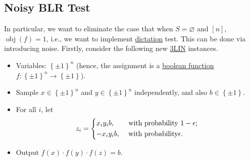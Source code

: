 \subsection{Noisy BLR Test}
In particular, we want to eliminate the case that when \(S = \varnothing \) and \([n]\), \(\mathop{\mathrm{obj}}(f) = 1\), i.e., we want to implement \hyperref[def:dictation]{dictation} test. This can be done via introducing noise. Firstly, consider the following new \hyperref[prb:max-3LIN]{3LIN} instances.

\begin{itemize}
	\item Variables: \(\left\{ \pm 1 \right\} ^n\) (hence, the assignment is a \hyperref[def:boolean-function]{boolean function} \(f\colon \left\{ \pm 1 \right\} ^n \to  \left\{ \pm 1 \right\} \)).
	\item Sample \(x\in \left\{ \pm 1 \right\} ^n\) and \(y\in \left\{ \pm 1 \right\} ^n\) independently, and also \(b\in \left\{ \pm 1 \right\} \).
	\item For all \(i\), let
	      \[
		      z_i = \begin{dcases}
			      x_i y_i b,  & \text{ with probability } 1-\epsilon  ; \\
			      -x_i y_i b, & \text{ with probability} \epsilon  .
		      \end{dcases}
	      \]
	\item Output \(f(x) \cdot f(y)\cdot f(z) = b\).
\end{itemize}


